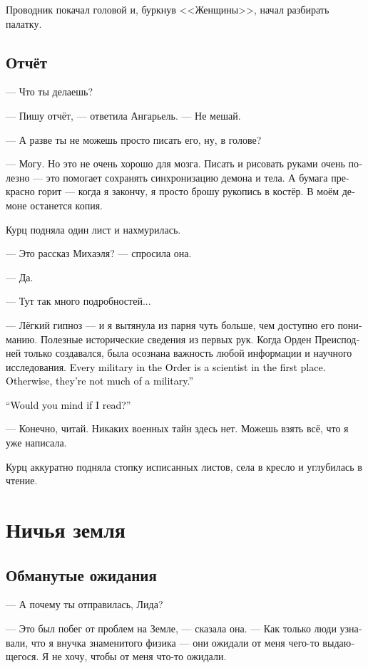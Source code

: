 \documentclass[a4paper,12pt,fleqn]{book}\usepackage{cooltooltips}\usepackage{polyglossia}\setdefaultlanguage[babelshorthands=true]{russian}\setotherlanguage{english}\defaultfontfeatures{Ligatures=TeX,Mapping=tex-text} \usepackage{xcolor}\definecolor{lightgray}{HTML}{bbbbbb}\color{lightgray}\newcommand{\ml}[3]{\textenglish{\textcolor{black}{#3}}}
\begin{document}
Проводник покачал головой и, буркнув <<Женщины>>, начал разбирать палатку.

\section{Отчёт}

--- Что ты делаешь?

--- Пишу отчёт, --- ответила Ангарьель.
--- Не мешай.

--- А разве ты не можешь просто писать его, ну, в голове?

--- Могу.
Но это не очень хорошо для мозга.
Писать и рисовать руками очень полезно --- это помогает сохранять синхронизацию демона и тела.
А бумага прекрасно горит --- когда я закончу, я просто брошу рукопись в костёр.
В моём демоне останется копия.

Курц подняла один лист и нахмурилась.

--- Это рассказ Михаэля? --- спросила она.

--- Да.

--- Тут так много подробностей...

--- Лёгкий гипноз --- и я вытянула из парня чуть больше, чем доступно его пониманию.
Полезные исторические сведения из первых рук.
Когда Орден Преисподней только создавался, была осознана важность любой информации и научного исследования.
\ml{$0$}
{Каждый военный в Ордене --- это в первую очередь учёный.}
{Every military in the Order is a scientist in the first place.}
\ml{$0$}
{Если же нет --- он военный не ахти.}
{Otherwise, they're not much of a military.''}

\ml{$0$}
{--- Ты не против, если я почитаю?}
{``Would you mind if I read?''}

--- Конечно, читай.
Никаких военных тайн здесь нет.
Можешь взять всё, что я уже написала.

Курц аккуратно подняла стопку исписанных листов, села в кресло и углубилась в чтение.

\chapter{Ничья земля}

\section{Обманутые ожидания}

--- А почему ты отправилась, Лида?

--- Это был побег от проблем на Земле, --- сказала она.
--- Как только люди узнавали, что я внучка знаменитого физика --- они ожидали от меня чего-то выдающегося.
Я не хочу, чтобы от меня что-то ожидали.
\end{document}
